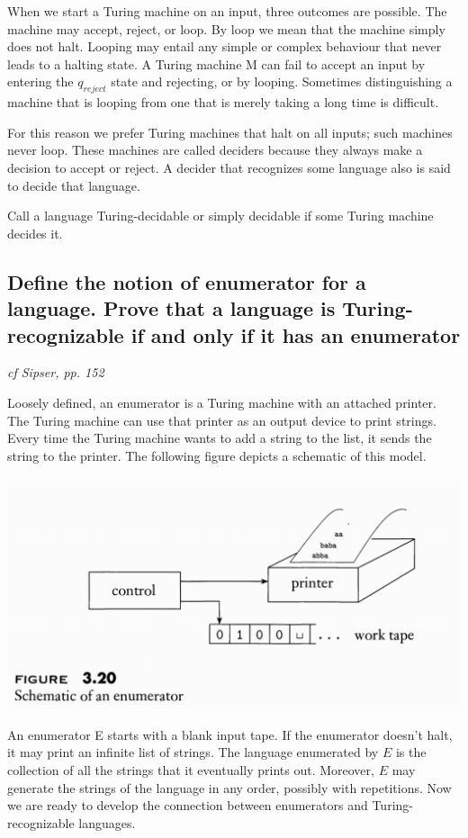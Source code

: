 \documentclass[main.tex]{subfiles}
\begin{document}
When we start a Turing machine on an input, three outcomes are possible.
The machine may accept, reject, or loop. By loop we mean that the machine simply
does not halt. Looping may entail any simple or complex behaviour that never
leads to a halting state.
A Turing machine M can fail to accept an input by entering the $q_{reject}$ state
and rejecting, or by looping. Sometimes distinguishing a machine that is looping
from one that is merely taking a long time is difficult. 
\par For this reason we prefer Turing machines that halt on all inputs; such machines never loop. These machines are called deciders because they always make a decision to accept or reject.
A decider that recognizes some language also is said to decide that language. 
\begin{mytheo*}{}
Call a language Turing-decidable or simply decidable if some
Turing machine decides it.
\end{mytheo*}

\subsection{Define the notion of enumerator for a language. Prove that a language is Turing-recognizable if and only if it has an enumerator}
\emph{cf Sipser, pp. 152}
\par Loosely defined, an enumerator is a Turing machine with an attached printer. The Turing machine can use that printer as an output device to print strings. Every time the Turing machine wants to add a string to the list, it sends the string to the printer. The following figure depicts a
schematic of this model. 
\begin{center}
    \includegraphics[scale=0.47]{images/figure320.png}
\end{center}
An enumerator E starts with a blank input tape. If the enumerator doesn’t
halt, it may print an infinite list of strings. The language enumerated by $E$
is the collection of all the strings that it eventually prints out. Moreover, $E$
may generate the strings of the language in any order, possibly with repetitions.
Now we are ready to develop the connection between enumerators and Turing-recognizable languages. 
\end{document}
